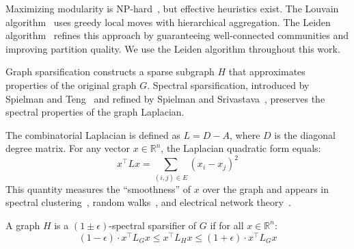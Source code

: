 \documentclass[10pt,journal,compsoc]{IEEEtran}
\begin{document}
Maximizing modularity is NP-hard~\cite{brandes2007modularity}, but effective 
heuristics exist. The Louvain algorithm~\cite{blondel2008fast} uses greedy 
local moves with hierarchical aggregation. The Leiden 
algorithm~\cite{traag2019louvain} refines this approach by guaranteeing 
well-connected communities and improving partition quality. We use the 
Leiden algorithm throughout this work.


Graph sparsification constructs a sparse subgraph $H$ that approximates 
properties of the original graph $G$. Spectral sparsification, introduced 
by Spielman and Teng~\cite{spielman2004nearly} and refined by Spielman and 
Srivastava~\cite{spielman2008graph}, preserves the spectral properties of 
the graph Laplacian.

The combinatorial Laplacian is defined as $L = D - A$, where $D$ is the 
diagonal degree matrix. For any vector $x \in \mathbb{R}^n$, the Laplacian 
quadratic form equals:
\begin{equation}
x^\top L x = \sum_{(i,j) \in E} (x_i - x_j)^2
\label{eq:laplacian-quadratic}
\end{equation}
This quantity measures the ``smoothness'' of $x$ over the graph and appears 
in spectral clustering~\cite{von2007tutorial}, random 
walks~\cite{lovasz1993random}, and electrical network 
theory~\cite{doyle1984random}.

A graph $H$ is a $(1 \pm \epsilon)$-spectral sparsifier of $G$ if for all 
$x \in \mathbb{R}^n$:
\begin{equation}
(1 - \epsilon) \cdot x^\top L_G x \leq x^\top L_H x \leq (1 + \epsilon) \cdot x^\top L_G x
\label{eq:spectral-approx}
\end{equation}
\end{document}
